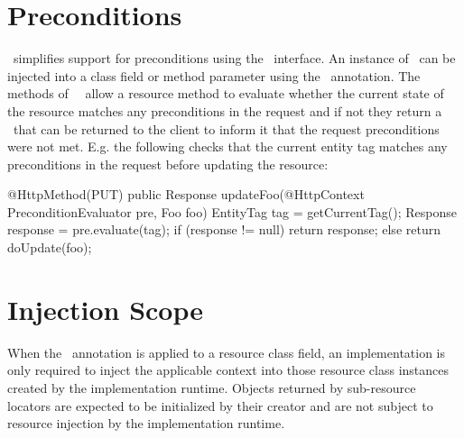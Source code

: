 \section{Preconditions}

\jaxrs\ simplifies support for preconditions using the \PreconditionEvaluator\ interface. An instance of \PreconditionEvaluator\ can be injected into a class field or method parameter using the \HttpContext\ annotation. The methods of \ \PreconditionEvaluator\ allow a resource method to evaluate whether the current state of the resource matches any preconditions in the request and if not they return a \Response\ that can be returned to the client to inform it that the request preconditions were not met. E.g. the following checks that the current entity tag matches any preconditions in the request before updating the resource:

\begin{listing}{1}
@HttpMethod(PUT)
public Response updateFoo(@HttpContext PreconditionEvaluator pre, Foo foo) {
	EntityTag tag = getCurrentTag();
	Response response = pre.evaluate(tag);
	if (response != null)
	  return response;
	else
	  return doUpdate(foo);
}
\end{listing}

\section{Injection Scope}

When the \HttpContext\ annotation is applied to a resource class field, an implementation is only required to inject the applicable context into those resource class instances created by the implementation runtime. Objects returned by sub-resource locators are expected to be initialized by their creator and are not subject to resource injection by the implementation runtime.
